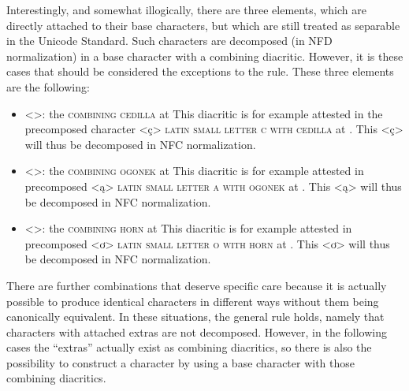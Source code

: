 Interestingly, and somewhat illogically, there are three elements, which are
directly attached to their base characters, but which are still treated as
separable in the Unicode Standard. Such characters are decomposed (in NFD
normalization) in a base character with a combining diacritic. However, it is
these cases that should be considered the exceptions to the rule. These three 
elements are the following:

\begin{itemize}

  \item <>: the \textsc{combining cedilla} at  \newline 
        This diacritic is
        for example attested in the precomposed character <ç> \textsc{latin
        small letter c with cedilla} at . This <ç> will thus be
        decomposed in NFC normalization.
  \item <>: the \textsc{combining ogonek} at  \newline 
        This diacritic is
        for example attested in precomposed <ą> \textsc{latin small letter a
        with ogonek} at . This <ą> will thus be decomposed in NFC
        normalization.
  \item <>: the \textsc{combining horn} at  \newline 
        This diacritic is for
        example attested in precomposed <ơ> \textsc{latin small letter o with
        horn} at . This <ơ> will thus be decomposed in NFC
        normalization. 

\end{itemize}

There are further combinations that deserve specific care because it is actually
possible to produce identical characters in different ways without them being
canonically equivalent. In these situations, the general rule holds, namely that
characters with attached extras are not decomposed. However, in the following
cases the ``extras'' actually exist as combining diacritics, so there is also 
the possibility to construct a character by using a base character with those 
combining diacritics.

